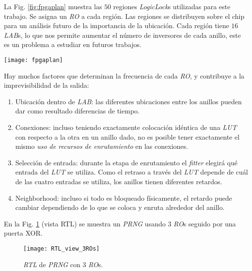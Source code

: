La Fig. \ref{fig:fpgaplan} muestra las $50$ regiones \emph{LogicLock}s utilizadas para este trabajo.
Se asigna un \emph{RO} a cada región.
Las regiones se distribuyen sobre el chip para un análisis futuro de la importancia de la ubicación.
Cada región tiene $16$ \emph{LAB}s, lo que nos permite aumentar el número de inversores de cada anillo, este es un problema a estudiar en futuros trabajos.
%
\begin{figure*}
\begin{center}
\texttt{[image: fpgaplan]}
\caption{Vista de las regiones \emph{LogicLock} del \emph{Chip Planner}.}
\label{fig:fpgaplan}
\end{center}
\end{figure*}

Hay muchos factores que determinan la frecuencia de cada \emph{RO}, y contribuye a la imprevisibilidad de la salida:
\begin{enumerate}

\item Ubicación dentro de \emph{LAB}: las diferentes ubicaciones entre los anillos pueden dar como resultado diferencias de tiempo.
\item Conexiones: incluso teniendo exactamente colocación idéntica de una \emph{LUT} con respecto a la otra en un anillo dado, no es posible tener exactamente el mismo \emph{uso de recursos de enrutamiento} en las conexiones.
\item Selección de entrada: durante la etapa de enrutamiento el \emph{fitter} elegirá qué entrada del \emph{LUT} se utiliza. Como el retraso a través del \emph{LUT} depende de cuál de las cuatro entradas se utiliza, los anillos tienen diferentes retardos.
\item Neighborhood: incluso si todo es bloqueado físicamente, el retardo puede cambiar dependiendo de lo que se coloca y enruta alrededor del anillo.
\end{enumerate}


En la Fig. \ref{fig:RTL3rings} (vista RTL) se muestra un \emph{PRNG} usando $3$ \emph{RO}s seguido por una puerta XOR.
%
\begin{figure}
\begin{center}
\texttt{[image: RTL\_view\_3ROs]}
\caption{\emph{RTL} de \emph{PRNG} con $3$ \emph{RO}s.}
\label{fig:RTL3rings}
\end{center}
\end{figure}


